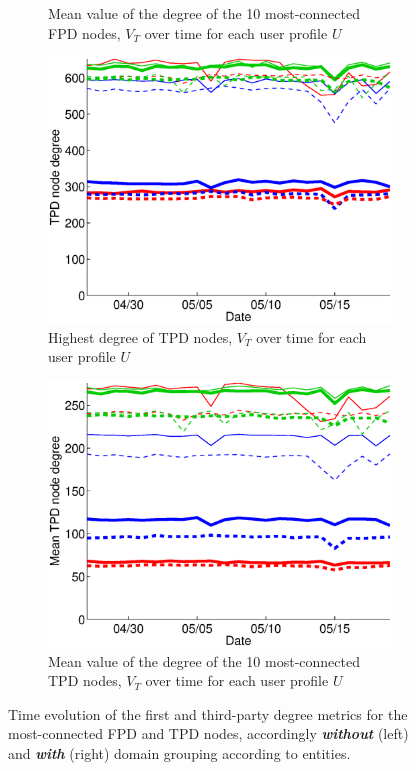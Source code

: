 \documentclass{sig-alternate}
\begin{document}
\begin{figure}
\begin{subfigure}{.38\textwidth}
    \caption{Mean value of the degree of the 10 most-connected FPD nodes, $V_T$ over time for each user profile $U$}
    \label{fig:first_mean_top10_with_entities}
  \end{subfigure}
  \begin{subfigure}{.38\textwidth}
    \includegraphics[width=\textwidth]{figures/plots/third-mean-top1-entities.eps}
    \caption{Highest degree of TPD nodes, $V_T$ over time for each user profile $U$}
    \label{fig:third_mean_top1_with_entities}
  \end{subfigure}
  \begin{subfigure}{.38\textwidth}
    \includegraphics[width=\textwidth]{figures/plots/third-mean-top10-entities.eps}
    \caption{Mean value of the degree of the 10 most-connected TPD nodes, $V_T$ over time for each user profile $U$}
    \label{fig:third_mean_top10_with_entities}
  \end{subfigure}

  \caption{Time evolution of the first and third-party degree metrics for the most-connected FPD and TPD nodes, accordingly \textbf{\textit{without}} (left) and \textbf{\textit{with}} (right) domain grouping according to entities.}
  \label{fig:highest_degree_nodes}

  \end{figure}
\end{document}
